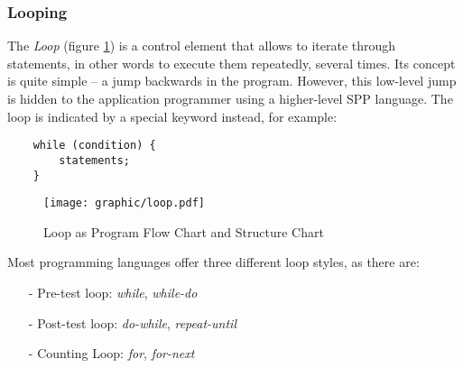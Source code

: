%
%
%
%
%
%
%

\subsubsection{Looping}
\label{looping_heading}

The \emph{Loop} (figure \ref{loop_figure}) is a control element that allows to
iterate through statements, in other words to execute them repeatedly, several
times. Its concept is quite simple -- a jump backwards in the program. However,
this low-level jump is hidden to the application programmer using a higher-level
SPP language. The loop is indicated by a special keyword instead, for example:

\begin{scriptsize}
    \begin{verbatim}
    while (condition) {
        statements;
    }
    \end{verbatim}
\end{scriptsize}

\begin{figure}[ht]
    \begin{center}
        \texttt{[image: graphic/loop.pdf]}
        \caption{Loop as Program Flow Chart and Structure Chart}
        \label{loop_figure}
    \end{center}
\end{figure}

Most programming languages offer three different loop styles, as there are:

\begin{itemize}
    \item[-] Pre-test loop: \emph{while}, \emph{while-do}
    \item[-] Post-test loop: \emph{do-while}, \emph{repeat-until}
    \item[-] Counting Loop: \emph{for}, \emph{for-next}
\end{itemize}

